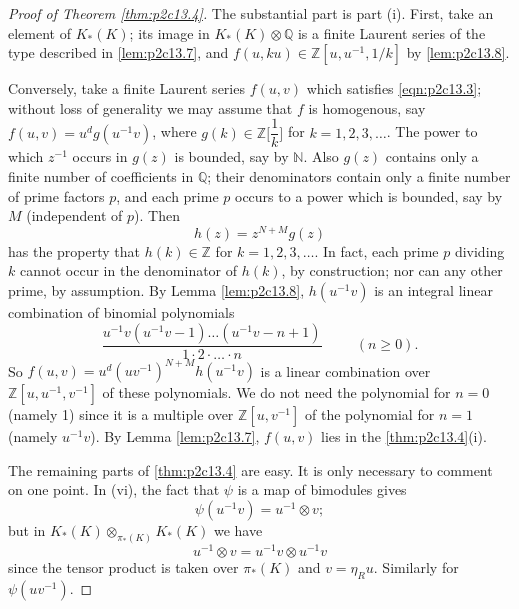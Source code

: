 \documentclass[../main]{subfiles}
\begin{document}
\begin{proof}[Proof of Theorem \ref{thm:p2c13.4}]
The substantial part is part (i). First, take an element of $K_\ast(K)$; its image in $K_\ast(K)\otimes\mathbb{Q}$ is a finite Laurent series of the type described in \eqref{lem:p2c13.7}, and $f(u, ku)\in \mathbb{Z}[u,u^{-1}, 1/k]$ by \eqref{lem:p2c13.8}.

Conversely, take a finite Laurent series $f(u,v)$ which satisfies \eqref{eqn:p2c13.3}; without loss of generality we may assume that $f$ is homogenous, say $f(u,v) = u^dg(u^{-1}v)$, where $g(k)\in\mathbb{Z}\Big[\dfrac{1}{k}\Big]$ for $k=1,2,3,\dots$. The power to which $z^{-1}$ occurs in $g(z)$ is bounded, say by $\mathbb{N}$. Also $g(z)$ contains only a finite number of coefficients in $\mathbb{Q}$; their denominators contain only a finite number of prime factors $p$, and each prime $p$ occurs to a power which is bounded, say by $M$ (independent of $p$). Then \[h(z) = z^{N+M}g(z)\] has the property that $h(k) \in \mathbb{Z}$ for $k = 1,2,3,\dots$. In fact, each prime $p$ dividing $k$ cannot occur in the denominator of $h(k)$, by construction; nor can any other prime, by assumption. By Lemma \ref{lem:p2c13.8}, $h(u^{-1}v)$ is an integral linear combination of binomial polynomials \[\dfrac{u^{-1}v(u^{-1}v-1)\ldots(u^{-1}v-n+1)}{1\cdot 2 \cdot \ldots \cdot n}\hspace{1cm} (n\ge 0).\] So $f(u,v) = u^d (uv^{-1})^{N+M}h(u^{-1}v)$ is a linear combination over $\mathbb{Z}[u,u^{-1},v^{-1}]$ of these polynomials. We do not need the polynomial for $n=0$ (namely 1) since it is a multiple over $\mathbb{Z}[u,v^{-1}]$ of the polynomial for $n=1$ (namely $u^{-1}v$). By Lemma \ref{lem:p2c13.7}, $f(u,v)$ lies in the \eqref{thm:p2c13.4}(i). 

The remaining parts of \eqref{thm:p2c13.4} are easy. It is only necessary to
comment on one point. In (vi), the fact that $\psi$ is a map of bimodules
gives \[\psi(u^{-1} v) = u^{-1}\otimes v;\] but in $K_\ast(K)\otimes_{\pi_\ast(K)} K_\ast(K)$ we have \[u^{-1}\otimes v = u^{-1}v\otimes u^{-1}v\] since the tensor product is taken over $\pi_\ast(K)$ and $v=\eta_R u$. Similarly for $\psi(uv^{-1})$.
\end{proof}
\end{document}
